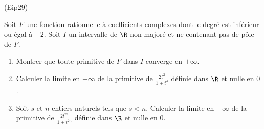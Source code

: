 \begin{tiny}(Eip29)\end{tiny} Soit $F$ une fonction rationnelle à coefficients complexes dont le degré est inférieur ou égal à $-2$. Soit $I$ un intervalle de $\R$ non majoré et ne contenant pas de pôle de $F$. 
\begin{enumerate}
 \item Montrer que toute primitive de $F$ dans $I$ converge en $+\infty$.
 \item Calculer la limite en $+\infty$ de la primitive de $\frac{2t^2}{1+t^4}$ définie dans $\R$ et nulle en $0$.
 \item Soit $s$ et $n$ entiers naturels tels que $s<n$. Calculer la limite en $+\infty$ de la primitive de $\frac{2t^{2s}}{1+t^{2n}}$ définie dans $\R$ et nulle en $0$. 
\end{enumerate}
  